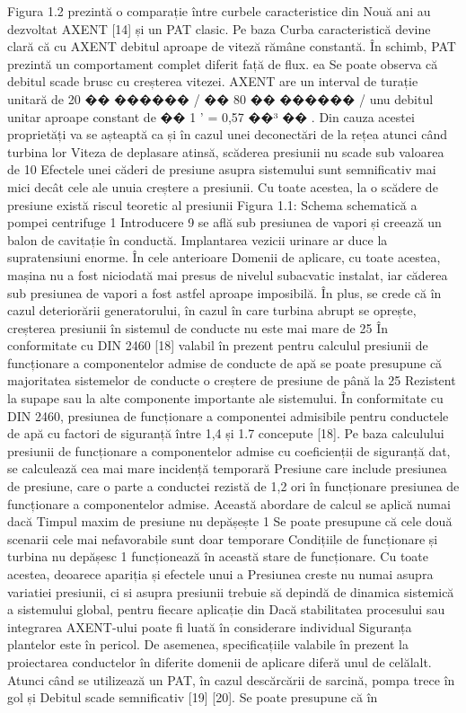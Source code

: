 Figura 1.2 prezintă o comparație între curbele caracteristice din
Nouă ani au dezvoltat AXENT [14] și un PAT clasic. Pe baza
Curba caracteristică devine clară că cu AXENT debitul aproape de viteză
rămâne constantă. În schimb, PAT prezintă un comportament complet diferit față de flux. ea
Se poate observa că debitul scade brusc cu creșterea vitezei.
AXENT are un interval de turație unitară de 20 �� ������ / �� 80 �� ������ / unu
debitul unitar aproape constant de �� 1
'
= 0,57
��³
��
. Din cauza acestei proprietăți va
se așteaptă ca și în cazul unei deconectări de la rețea atunci când turbina lor
Viteza de deplasare atinsă, scăderea presiunii nu scade sub valoarea de 10%
Efectele unei căderi de presiune asupra sistemului sunt semnificativ mai mici decât cele ale unuia
creștere a presiunii. Cu toate acestea, la o scădere de presiune există riscul teoretic al presiunii
Figura 1.1: Schema schematică a pompei centrifuge
1 Introducere
9
se află sub presiunea de vapori și creează un balon de cavitație în conductă.
Implantarea vezicii urinare ar duce la supratensiuni enorme. În cele anterioare
Domenii de aplicare, cu toate acestea, mașina nu a fost niciodată mai presus de nivelul subacvatic
instalat, iar căderea sub presiunea de vapori a fost astfel aproape imposibilă.
În plus, se crede că în cazul deteriorării generatorului, în cazul în care turbina
abrupt se oprește, creșterea presiunii în sistemul de conducte nu este mai mare de 25%
În conformitate cu DIN 2460 [18] valabil în prezent pentru calculul presiunii de funcționare a componentelor admise
de conducte de apă se poate presupune că majoritatea sistemelor de conducte
o creștere de presiune de până la 25%
Rezistent la supape sau la alte componente importante ale sistemului. În conformitate cu DIN 2460,
presiunea de funcționare a componentei admisibile pentru conductele de apă cu factori de siguranță între 1,4
și 1.7 concepute [18]. Pe baza calculului presiunii de funcționare a componentelor admise
cu coeficienții de siguranță dat, se calculează cea mai mare incidență temporară
Presiune care include presiunea de presiune, care o parte a conductei rezistă de 1,2 ori în funcționare
presiunea de funcționare a componentelor admise. Această abordare de calcul se aplică numai dacă
Timpul maxim de presiune nu depășește 1%
Se poate presupune că cele două scenarii cele mai nefavorabile sunt doar temporare
Condițiile de funcționare și turbina nu depășesc 1%
funcționează în această stare de funcționare. Cu toate acestea, deoarece apariția și efectele unui a
Presiunea creste nu numai asupra variatiei presiunii, ci si asupra presiunii
trebuie să depindă de dinamica sistemică a sistemului global, pentru fiecare aplicație din
Dacă stabilitatea procesului sau integrarea AXENT-ului poate fi luată în considerare individual
Siguranța plantelor este în pericol. De asemenea, specificațiile valabile în prezent la
proiectarea conductelor în diferite domenii de aplicare
diferă unul de celălalt.
Atunci când se utilizează un PAT, în cazul descărcării de sarcină, pompa trece în gol și
Debitul scade semnificativ [19] [20]. Se poate presupune că în




